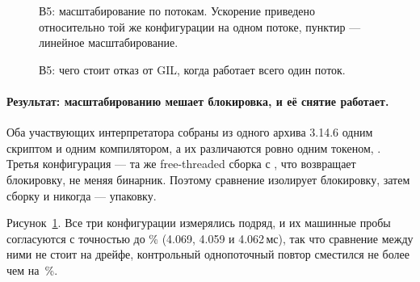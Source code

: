 \begin{figure}[t]
  \centering
  \caption{В5: масштабирование по потокам. Ускорение приведено относительно той же конфигурации на
    одном потоке, пунктир --- линейное масштабирование.}
  \label{fig:threads}
\end{figure}

\begin{figure}[t]
  \centering
  \caption{В5: чего стоит отказ от GIL, когда работает всего один поток.}
  \label{fig:fttax}
\end{figure}

\paragraph{Результат: масштабированию мешает блокировка, и её снятие работает.}
Оба участвующих интерпретатора собраны из одного архива 3.14.6 одним скриптом и одним
компилятором, а их  различаются ровно одним токеном, .
Третья конфигурация --- та же free-threaded сборка с , что возвращает
блокировку, не меняя бинарник. Поэтому сравнение изолирует блокировку, затем сборку и никогда ---
упаковку.

Рисунок~\ref{fig:threads}. Все три конфигурации измерялись подряд, и их машинные пробы согласуются
с точностью до \% (4.069, 4.059 и 4.062\,мс), так что сравнение между ними не стоит на дрейфе,
контрольный однопоточный повтор сместился не более чем на \,\%.

